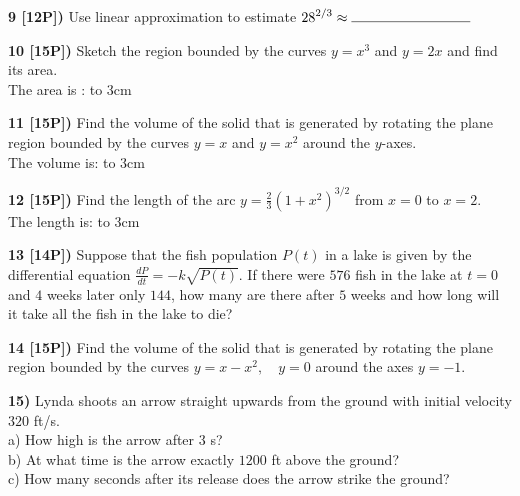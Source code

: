 \documentclass[12pt]{article}
\begin{document}
\vspace{.25in}


{\bf 9 [12P])}
Use linear approximation to estimate
$\displaystyle{28^{2/3}\approx\hbox  to 3cm{\hrulefill} }$
\vspace{.25in}

{\bf 10 [15P])} Sketch the region bounded by the curves
$\displaystyle{y=x^3}$ and ${\displaystyle y =  2x}$ and find its area.
\\

The area is : \hbox  to 3cm{\hrulefill}


\vspace{.25in}

{\bf 11 [15P])} Find the volume of the solid that is generated
by rotating the plane region bounded
by the curves  $\displaystyle{y= x}$ and
${\displaystyle y =  x^2}$  around the $y$-axes.
\\

The volume is: \hbox  to 3cm{\hrulefill} 

\vspace{.25in}

{\bf 12 [15P])} Find the length of the arc
$\displaystyle{y = \frac{2}{3}\left(1 + x^2\right)^{3/2}}$
from $\displaystyle{x=0}$ to $\displaystyle{x = 2}$.
\\

The length is: \hbox  to 3cm{\hrulefill}

\vspace{.25in}


{\bf 13 [14P])} Suppose that the fish population $P(t)$ in a
lake is given by the differential equation
${\displaystyle \frac{dP}{dt} = - k\sqrt{P(t)}}$. If
there were $576$ fish in the lake at $t=0$ and
$4$ weeks later only
$144$, how many are there after $5$ weeks and how long will it
take all the fish in the lake to die?

\vspace{.25in}


{\bf 14 [15P])} Find the volume of the solid that is generated
by rotating the plane region bounded
by the curves  $\displaystyle{y= x -x ^2,\quad
y = 0}$ around the axes  $y=-1$.
\\ %

\vspace{.25in}

{\bf 15)} Lynda shoots an arrow straight upwards from the
ground with initial velocity $320$ ft/s.
\\ %
a) How high is the arrow after $3$ s?
\\
b) At what time is the arrow exactly $1200$ ft above
the ground?
\\
c) How many seconds after its release does the arrow strike the
ground?
\end{document}
